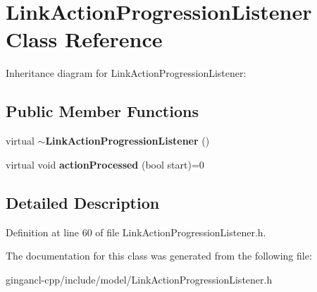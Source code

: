 \section{LinkActionProgressionListener Class Reference}
\label{classbr_1_1pucrio_1_1telemidia_1_1ginga_1_1ncl_1_1model_1_1link_1_1LinkActionProgressionListener}
Inheritance diagram for LinkActionProgressionListener:\subsection*{Public Member Functions}
\begin{CompactItemize}
\item 
virtual {\bf $\sim$LinkActionProgressionListener} ()\label{classbr_1_1pucrio_1_1telemidia_1_1ginga_1_1ncl_1_1model_1_1link_1_1LinkActionProgressionListener_b7047b244cc81823c81862d0469384cb}

\item 
virtual void \textbf{actionProcessed} (bool start)=0\label{classbr_1_1pucrio_1_1telemidia_1_1ginga_1_1ncl_1_1model_1_1link_1_1LinkActionProgressionListener_e3aa9ad5f16fd8c7415ee5643ea32ae4}

\end{CompactItemize}


\subsection{Detailed Description}




Definition at line 60 of file LinkActionProgressionListener.h.

The documentation for this class was generated from the following file:\begin{CompactItemize}
\item 
gingancl-cpp/include/model/LinkActionProgressionListener.h\end{CompactItemize}
